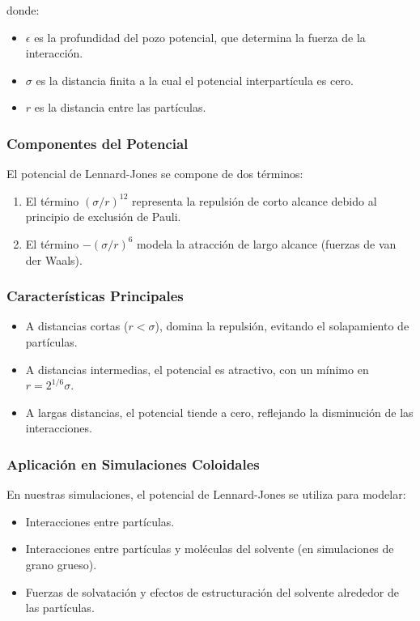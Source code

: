 \documentclass[twocolumn]{article}
\begin{document}
donde:
\begin{itemize}
    \item $\epsilon$ es la profundidad del pozo potencial, que determina la fuerza de la interacción.
    \item $\sigma$ es la distancia finita a la cual el potencial interpartícula es cero.
    \item $r$ es la distancia entre las partículas.
\end{itemize}

\subsubsection*{Componentes del Potencial}
El potencial de Lennard-Jones se compone de dos términos:

\begin{enumerate}
    \item El término $(\sigma/r)^{12}$ representa la repulsión de corto alcance debido al principio de exclusión de Pauli.
    \item El término $-(\sigma/r)^{6}$ modela la atracción de largo alcance (fuerzas de van der Waals).
\end{enumerate}

\subsubsection*{Características Principales}
\begin{itemize}
    \item A distancias cortas ($r < \sigma$), domina la repulsión, evitando el solapamiento de partículas.
    \item A distancias intermedias, el potencial es atractivo, con un mínimo en $r = 2^{1/6}\sigma$.
    \item A largas distancias, el potencial tiende a cero, reflejando la disminución de las interacciones.
\end{itemize}

\subsubsection*{Aplicación en Simulaciones Coloidales}
En nuestras simulaciones, el potencial de Lennard-Jones se utiliza para modelar:

\begin{itemize}
    \item Interacciones entre partículas.
    \item Interacciones entre partículas y moléculas del solvente (en simulaciones de grano grueso).
    \item Fuerzas de solvatación y efectos de estructuración del solvente alrededor de las partículas.
\end{itemize}
\end{document}
